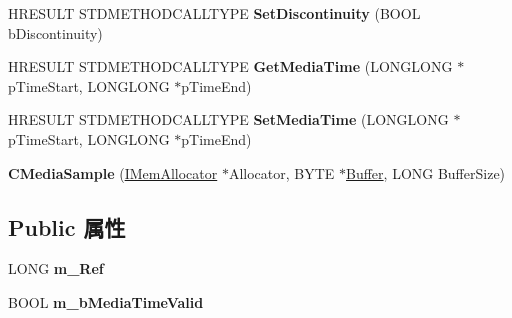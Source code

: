 \begin{DoxyCompactItemize}
\item 
\mbox{\label{class_c_media_sample_ac446ad1e5b015b75dd4441dfe663da64}} 
H\+R\+E\+S\+U\+LT S\+T\+D\+M\+E\+T\+H\+O\+D\+C\+A\+L\+L\+T\+Y\+PE {\bfseries Set\+Discontinuity} (B\+O\+OL b\+Discontinuity)
\item 
\mbox{\label{class_c_media_sample_ae26673715a1fb83a06ac1202f4c9f15f}} 
H\+R\+E\+S\+U\+LT S\+T\+D\+M\+E\+T\+H\+O\+D\+C\+A\+L\+L\+T\+Y\+PE {\bfseries Get\+Media\+Time} (L\+O\+N\+G\+L\+O\+NG $\ast$p\+Time\+Start, L\+O\+N\+G\+L\+O\+NG $\ast$p\+Time\+End)
\item 
\mbox{\label{class_c_media_sample_a63c8597fa311ffc8f03c652e8976ca26}} 
H\+R\+E\+S\+U\+LT S\+T\+D\+M\+E\+T\+H\+O\+D\+C\+A\+L\+L\+T\+Y\+PE {\bfseries Set\+Media\+Time} (L\+O\+N\+G\+L\+O\+NG $\ast$p\+Time\+Start, L\+O\+N\+G\+L\+O\+NG $\ast$p\+Time\+End)
\item 
\mbox{\label{class_c_media_sample_a90d1b1743728792af38fd1b510d59b93}} 
{\bfseries C\+Media\+Sample} (\hyperlink{interface_i_mem_allocator}{I\+Mem\+Allocator} $\ast$Allocator, B\+Y\+TE $\ast$\hyperlink{class_buffer}{Buffer}, L\+O\+NG Buffer\+Size)
\end{DoxyCompactItemize}
\subsection*{Public 属性}
\begin{DoxyCompactItemize}
\item 
\mbox{\label{class_c_media_sample_a5c69523f71bca031f593f29c14868100}} 
L\+O\+NG {\bfseries m\+\_\+\+Ref}
\item 
\mbox{\label{class_c_media_sample_aa36ea8da77acdab0be77fc066a228e37}} 
B\+O\+OL {\bfseries m\+\_\+b\+Media\+Time\+Valid}
\end{DoxyCompactItemize}
